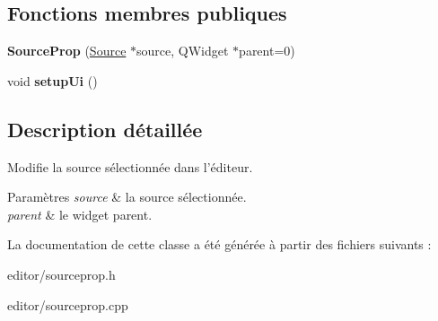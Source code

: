 \subsection*{Fonctions membres publiques}
\begin{DoxyCompactItemize}
\item 
\hypertarget{classSourceProp_ae2499296312b5f80c8dac887fa36008e}{{\bfseries Source\+Prop} (\hyperlink{classSource}{Source} $\ast$source, Q\+Widget $\ast$parent=0)}\label{classSourceProp_ae2499296312b5f80c8dac887fa36008e}

\item 
\hypertarget{classSourceProp_aa77a6eec73ae9dc526fc7cbc8f24138a}{void {\bfseries setup\+Ui} ()}\label{classSourceProp_aa77a6eec73ae9dc526fc7cbc8f24138a}

\end{DoxyCompactItemize}


\subsection{Description détaillée}
Modifie la source sélectionnée dans l’éditeur. 


\begin{DoxyParams}{Paramètres}
{\em source} & la source sélectionnée. \\
\hline
{\em parent} & le widget parent. \\
\hline
\end{DoxyParams}


La documentation de cette classe a été générée à partir des fichiers suivants \+:\begin{DoxyCompactItemize}
\item 
editor/sourceprop.\+h\item 
editor/sourceprop.\+cpp\end{DoxyCompactItemize}
